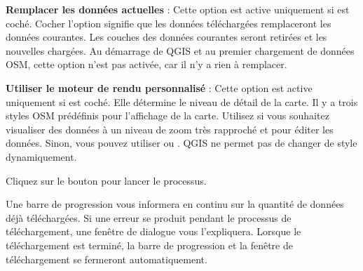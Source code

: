 \begin{description}
\item \textbf{Remplacer les données actuelles} : Cette option est active uniquement si  est coché. Cocher l'option signifie que les données téléchargées remplaceront les données courantes. Les couches des données courantes seront retirées et les nouvelles chargées. Au démarrage de QGIS et au premier chargement de données OSM, cette option n'est pas activée, car il n'y a rien à remplacer.
\item \textbf{Utiliser le moteur de rendu personnalisé} : Cette option est active uniquement si  est coché. Elle détermine le niveau de détail de la carte. Il y a trois styles OSM prédéfinis pour l'affichage de la carte. Utilisez  si vous souhaitez visualiser des données à un niveau de zoom très rapproché et pour éditer les données. Sinon, vous pouvez utiliser  ou . QGIS \CURRENT ne permet pas de changer de style dynamiquement.
\end{description}

Cliquez sur le bouton  pour lancer le processus.

Une barre de progression vous informera en continu sur la quantité de données déjà téléchargées. Si une erreur se produit pendant le processus de téléchargement, une fenêtre de dialogue vous l'expliquera. Lorsque le téléchargement est terminé, la barre de progression et la fenêtre de téléchargement se fermeront automatiquement.

